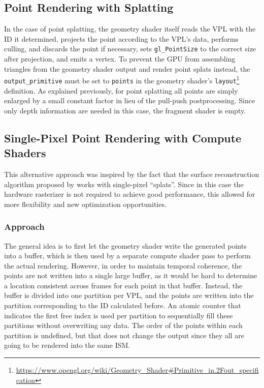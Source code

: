 \subsection{Point Rendering with Splatting}
\label{sec:impl:splatting}

In the case of point splatting, the geometry shader itself reads the VPL with the ID it determined, projects the point according to the VPL's data, performs culling, and discards the point if necessary, sets \texttt{gl\_PointSize} to the correct size after projection, and emits a vertex. To prevent the GPU from assembling triangles from the geometry shader output and render point splats instead, the \texttt{output\_primitive} must be set to \texttt{points} in the geometry shader's \texttt{layout}\footnote{\url{https://www.opengl.org/wiki/Geometry_Shader\#Primitive_in.2Fout_specification}} definition. As explained previously, for point splatting all points are simply enlarged by a small constant factor in lieu of the pull-push postprocessing. Since only depth information are needed in this case, the fragment shader is empty.



\subsection{Single-Pixel Point Rendering with Compute Shaders}
\label{sec:impl:singlePixelRendering}

This alternative approach was inspired by the fact that the surface reconstruction algorithm proposed by \citet{Marroquim:2007:reconstruction} works with single-pixel ``splats''. Since in this case the hardware rasterizer is not required to achieve good performance, this allowed for more flexibility and new optimization opportunities.

\subsubsection{Approach}

The general idea is to first let the geometry shader write the generated points into a buffer, which is then used by a separate compute shader pass to perform the actual rendering. However, in order to maintain temporal coherence, the points are not written into a single large buffer, as it would be hard to determine a location consistent across frames for each point in that buffer. Instead, the buffer is divided into one partition per VPL, and the points are written into the partition corresponding to the ID calculated before. An atomic counter that indicates the first free index is used per partition to sequentially fill these partitions without overwriting any data. The order of the points within each partition is undefined, but that does not change the output since they all are going to be rendered into the same ISM.


